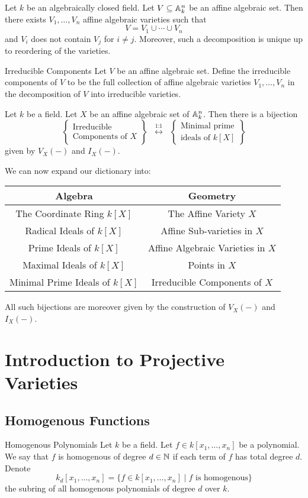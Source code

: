 \documentclass[a4paper]{article}
\begin{document}
\begin{thm}{}{} Let $k$ be an algebraically closed field. Let $V\subseteq\mathbb{A}_k^n$ be an affine algebraic set. Then there exists $V_1,\dots,V_n$ affine algebraic varieties such that $$V=V_1\cup\cdots\cup V_n$$ and $V_i$ does not contain $V_j$ for $i\neq j$. Moreover, such a decomposition is unique up to reordering of the varieties. 
\end{thm}

\begin{defn}{Irreducible Components}{} Let $V$ be an affine algebraic set. Define the irreducible components of $V$ to be the full collection of affine algebraic varieties $V_1,\dots,V_n$ in the decomposition of $V$ into irreducible varieties. 
\end{defn}

\begin{lmm}{}{} Let $k$ be a field. Let $X$ be an affine algebraic set of $\mathbb{A}_k^n$. Then there is a bijection $$\left\{\substack{\text{Irreducible}\\\text{Components of } X}\right\}\;\;\overset{\text{1:1}}{\longleftrightarrow}\;\;\left\{\substack{\text{Minimal prime}\\\text{ideals of }k[X]}\right\}$$ given by $V_X(-)$ and $I_X(-)$. 
\end{lmm}

We can now expand our dictionary into: \\
\begin{center}\begin{tabular}{c|c}
Algebra & Geometry\\
\hline
The Coordinate Ring $k[X]$ & The Affine Variety $X$\\
Radical Ideals of $k[X]$ & Affine Sub-varieties in $X$\\
Prime Ideals of $k[X]$ & Affine Algebraic Varieties in $X$\\
Maximal Ideals of $k[X]$ & Points in $X$\\
Minimal Prime Ideals of $k[X]$ & Irreducible Components of $X$
\end{tabular}\end{center}

All such bijections are moreover given by the construction of $V_X(-)$ and $I_X(-)$. 

\pagebreak
\section{Introduction to Projective Varieties}
\subsection{Homogenous Functions}
\begin{defn}{Homogenous Polynomials}{} Let $k$ be a field. Let $f\in k[x_1,\dots,x_n]$ be a polynomial. We say that $f$ is homogenous of degree $d\in\mathbb{N}$ if each term of $f$ has total degree $d$. Denote $$k_d[x_1,\dots,x_n]=\{f\in k[x_1,\dots,x_n]\;|\;f\text{ is homogenous}\}$$ the subring of all homogenous polynomials of degree $d$ over $k$. 
\end{defn}
\end{document}
